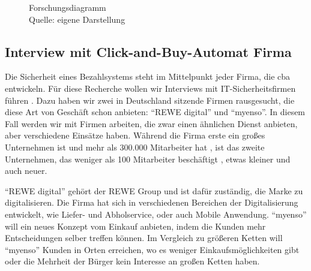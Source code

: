 \begin{figure}[H]
  \caption{Forschungsdiagramm
  \\ Quelle: eigene Darstellung}
  \label{fig:FD}
\end{figure}

\subsection{Interview mit Click-and-Buy-Automat Firma}

Die Sicherheit eines Bezahlsystems steht im Mittelpunkt jeder Firma, die \acrfull{cba} entwickeln. Für diese Recherche 
wollen wir Interviews mit IT-Sicherheitsfirmen führen \cite{refbook:FWDL}. Dazu haben wir zwei in Deutschland sitzende
Firmen rausgesucht, die diese Art von Geschäft schon anbieten: ``REWE digital'' und ``myenso''. In diesem Fall werden wir
mit Firmen arbeiten, die zwar einen ähnlichen Dienst anbieten, aber verschiedene Einsätze haben. Während die Firma erste 
ein großes Unternehmen ist und mehr als 300.000 Mitarbeiter hat \cite{refst:REWE}, ist das zweite Unternehmen, das weniger
als 100 Mitarbeiter beschäftigt \cite{refst:MYENSO}, etwas kleiner und auch neuer.

``REWE digital'' gehört der REWE Group und ist dafür zuständig, die Marke zu digitalisieren. Die Firma hat sich in verschiedenen 
Bereichen der Digitalisierung entwickelt, wie Liefer- und Abholservice, oder auch Mobile Anwendung. ``myenso'' will ein 
neues Konzept vom Einkauf anbieten, indem die Kunden mehr Entscheidungen selber treffen können. Im Vergleich zu größeren
Ketten will ``myenso'' Kunden in Orten erreichen, wo es weniger Einkaufsmöglichkeiten gibt oder die Mehrheit der Bürger
kein Interesse an großen Ketten haben.



